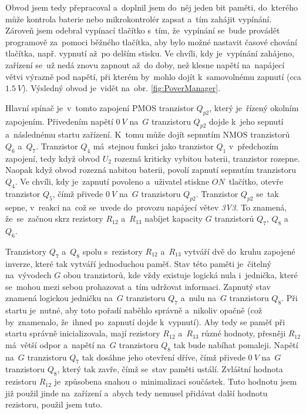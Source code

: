 Obvod jsem tedy přepracoval a~doplnil jsem do~něj jeden bit paměti, do~kterého může kontrola baterie nebo mikrokontrolér zapsat a~tím zahájit vypínání.
Zároveň jsem odebral vypínací tlačítko s~tím, že~vypínání se~bude provádět programově za~pomoci běžného tlačítka, aby bylo možné nastavit časové chování tlačítka, např. vypnutí až~po delším stisku. 
Ve chvíli, kdy je~vypínání zahájeno, zařízení se~už nedá znovu zapnout až~do doby, než klesne napětí na~napájecí větvi výrazně pod napětí, při kterém by~mohlo dojít k~samovolnému zapnutí (cca \(1.5~V\)).
Výsledný obvod je~vidět na~obr. \ref{fig:PoverManager}.

Hlavní spínač je~v~tomto zapojení PMOS tranzistor \(Q_{p2}\), který je~řízený okolním zapojením.
Přivedením napětí \(0~V\) na~\(G\) tranzistoru \(Q_{p2}\) dojde k~jeho sepnutí a~následnému startu zařízení.
K~tomu může dojít sepnutím NMOS tranzistorů \(Q_{6}\) a~\(Q_{7}\).
Tranzistor \(Q_{4}\) má~stejnou funkci jako tranzistor \(Q_{1}\) v~předchozím zapojení, tedy když obvod \(U_{2}\) rozezná kriticky vybitou baterii, tranzistor rozepne.
Naopak když obvod rozezná nabitou baterii, povolí zapnutí sepnutím tranzistoru \(Q_{4}\).
Ve chvíli, kdy je~zapnutí povoleno a~uživatel stiskne \(ON\)~tlačítko, otevře tranzistor \(Q_{5}\), čímž přivede \(0~V\) na~\(G\) tranzistoru \(Q_{p2}\).
Tranzistor \(Q_{p2}\) se~tak sepne, v~reakci na~což se~uvede do~provozu napájecí větev {\it 3V3}.
To znamená, že~se~začnou skrz rezistory \(R_{12}\) a~\(R_{13}\) nabíjet kapacity \(G\) tranzistorů \(Q_{7}\), \(Q_{8}\) a~\(Q_{6}\).

Tranzistory \(Q_{7}\) a~\(Q_{8}\) spolu s~rezistory \(R_{12}\) a~\(R_{13}\) vytváří dvě do~kruhu zapojené inverze, které tak vytváří jednoduchou paměť.
Stav této paměti je~čitelný na~vývodech \(G\) obou tranzistorů, kde vždy existuje logická nula i~jednička, které se~mohou mezi sebou prohazovat a~tím udržovat informaci.
Zapnutý stav znamená logickou jedničku na~\(G\) tranzistoru \(Q_{7}\) a~nulu na~\(G\) tranzistoru \(Q_{8}\).
Při startu je~nutné, aby toto pořadí naběhlo správně a~nikoliv opačně (což by~znamenalo, že~ihned po~zapnutí dojde k~vypnutí).
Aby tedy se paměť při startu správně inicializovala, mají rezistory \(R_{12}\) a~\(R_{13}\) různé hodnoty, přesněji \(R_{12}\) má~větší odpor a~napětí na~\(G\) tranzistoru \(Q_{8}\) tak bude nabíhat pomaleji.
Napětí na~\(G\) tranzistoru \(Q_{7}\) tak dosáhne jeho otevření dříve, čímž přivede \(0~V\) na~\(G\) tranzistoru \(Q_{8}\), který tak zavře, čímž se~stav paměti ustálí.
Zvláštní hodnota rezistoru \(R_{12}\) je~způsobena snahou o~minimalizaci součástek.
Tuto hodnotu jsem již použil jinde na~zařízení a~abych tedy nemusel přidávat další hodnotu rezistoru, použil jsem tuto.

